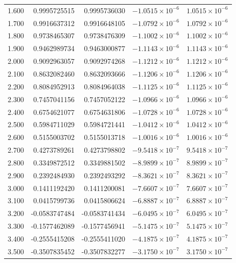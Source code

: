 \documentclass[11pt,a4paper]{article}
\begin{document}
\begin{longtable}{rrrrr}
1.600 & 0.9995725515 & 0.9995736030 & $-1.0515\times 10^{-6}$ & $1.0515\times 10^{-6}$ \\
1.700 & 0.9916637312 & 0.9916648105 & $-1.0792\times 10^{-6}$ & $1.0792\times 10^{-6}$ \\
1.800 & 0.9738465307 & 0.9738476309 & $-1.1002\times 10^{-6}$ & $1.1002\times 10^{-6}$ \\
1.900 & 0.9462989734 & 0.9463000877 & $-1.1143\times 10^{-6}$ & $1.1143\times 10^{-6}$ \\
2.000 & 0.9092963057 & 0.9092974268 & $-1.1212\times 10^{-6}$ & $1.1212\times 10^{-6}$ \\
2.100 & 0.8632082460 & 0.8632093666 & $-1.1206\times 10^{-6}$ & $1.1206\times 10^{-6}$ \\
2.200 & 0.8084952913 & 0.8084964038 & $-1.1125\times 10^{-6}$ & $1.1125\times 10^{-6}$ \\
2.300 & 0.7457041156 & 0.7457052122 & $-1.0966\times 10^{-6}$ & $1.0966\times 10^{-6}$ \\
2.400 & 0.6754621077 & 0.6754631806 & $-1.0728\times 10^{-6}$ & $1.0728\times 10^{-6}$ \\
2.500 & 0.5984711029 & 0.5984721441 & $-1.0412\times 10^{-6}$ & $1.0412\times 10^{-6}$ \\
2.600 & 0.5155003702 & 0.5155013718 & $-1.0016\times 10^{-6}$ & $1.0016\times 10^{-6}$ \\
2.700 & 0.4273789261 & 0.4273798802 & $-9.5418\times 10^{-7}$ & $9.5418\times 10^{-7}$ \\
2.800 & 0.3349872512 & 0.3349881502 & $-8.9899\times 10^{-7}$ & $8.9899\times 10^{-7}$ \\
2.900 & 0.2392484930 & 0.2392493292 & $-8.3621\times 10^{-7}$ & $8.3621\times 10^{-7}$ \\
3.000 & 0.1411192420 & 0.1411200081 & $-7.6607\times 10^{-7}$ & $7.6607\times 10^{-7}$ \\
3.100 & 0.0415799736 & 0.0415806624 & $-6.8887\times 10^{-7}$ & $6.8887\times 10^{-7}$ \\
3.200 & -0.0583747484 & -0.0583741434 & $-6.0495\times 10^{-7}$ & $6.0495\times 10^{-7}$ \\
3.300 & -0.1577462089 & -0.1577456941 & $-5.1475\times 10^{-7}$ & $5.1475\times 10^{-7}$ \\
3.400 & -0.2555415208 & -0.2555411020 & $-4.1875\times 10^{-7}$ & $4.1875\times 10^{-7}$ \\
3.500 & -0.3507835452 & -0.3507832277 & $-3.1750\times 10^{-7}$ & $3.1750\times 10^{-7}$ \\

\end{longtable}
\end{document}
